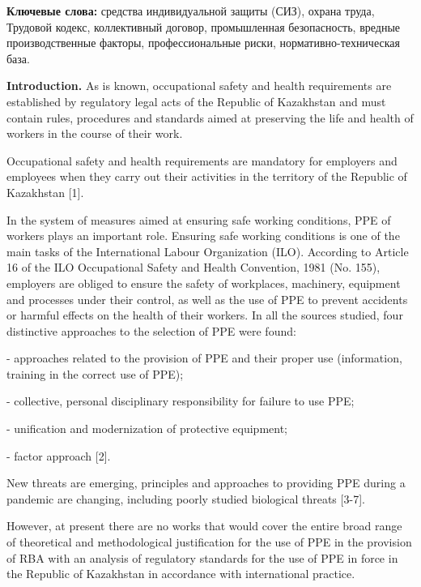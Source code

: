 {\bfseries Ключевые слова:} средства индивидуальной защиты (СИЗ), охрана
труда, Трудовой кодекс, коллективный договор, промышленная безопасность,
вредные производственные факторы, профессиональные риски,
нормативно-техническая база.

\begin{multicols}{2}
{\bfseries Introduction.} As is known, occupational safety and health
requirements are established by regulatory legal acts of the Republic of
Kazakhstan and must contain rules, procedures and standards aimed at
preserving the life and health of workers in the course of their work.

Occupational safety and health requirements are mandatory for employers
and employees when they carry out their activities in the territory of
the Republic of Kazakhstan {[}1{]}.

In the system of measures aimed at ensuring safe working conditions, PPE
of workers plays an important role. Ensuring safe working conditions is
one of the main tasks of the International Labour Organization (ILO).
According to Article 16 of the ILO Occupational Safety and Health
Convention, 1981 (No. 155), employers are obliged to ensure the safety
of workplaces, machinery, equipment and processes under their control,
as well as the use of PPE to prevent accidents or harmful effects on the
health of their workers. In all the sources studied, four distinctive
approaches to the selection of PPE were found:

- approaches related to the provision of PPE and their proper use
(information, training in the correct use of PPE);

- collective, personal disciplinary responsibility for failure to use
PPE;

- unification and modernization of protective equipment;

- factor approach {[}2{]}.

New threats are emerging, principles and approaches to providing PPE
during a pandemic are changing, including poorly studied biological
threats {[}3-7{]}.

However, at present there are no works that would cover the entire broad
range of theoretical and methodological justification for the use of PPE
in the provision of RBA with an analysis of regulatory standards for the
use of PPE in force in the Republic of Kazakhstan in accordance with
international practice.
\end{multicols}

